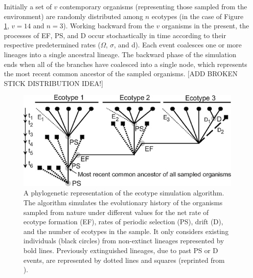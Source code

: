 Initially a set of $v$ contemporary organisms (representing those sampled from the environment) are randomly distributed among $n$ ecotypes (in the case of Figure \ref{fig:SpeciationGraph}, $v = 14$ and $n = 3$).
Working backward from the $v$ organisms in the present, the processes of EF, PS, and D occur stochastically in time according to their respective predetermined rates ($\Omega$, $\sigma$, and d).
Each event coalesces one or more lineages into  a single ancestral lineage.
The backward phase of the simulation ends when all of the branches have coalesced into a single node, which represents the most recent common ancestor of the sampled organisms.
[ADD BROKEN STICK DISTRIBUTION IDEA!]

\begin{figure}[h!]

  \centering
   \includegraphics{images/Speciation-CH2}
   \caption[Detailed phylogeny with putative ecotype simulation events.]{A phylogenetic representation of the ecotype simulation algorithm. The algorithm simulates the evolutionary history of the organisms sampled from nature under different values for the net rate of ecotype formation (EF), rates of periodic selection (PS), drift (D), and the number of ecotypes in the sample. It only considers existing individuals (black circles) from non-extinct lineages represented by bold lines. Previously extinguished lineages, due to past PS or D events, are represented by dotted lines and squares (reprinted from \protect\cite{koeppel2008identifying}).}
   \label{fig:SpeciationGraph}
\end{figure}

